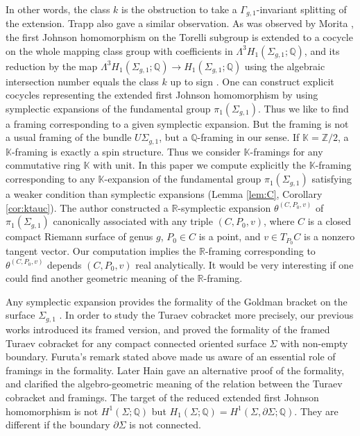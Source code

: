 \documentclass[a4paper,12pt, twoside]{amsart}
\theoremstyle{definition}
\theoremstyle{remark}
\numberwithin{equation}{section}
\newcommand\bK{{\mathbb{K}}}
\newcommand\bQ{{\mathbb{Q}}}
\newcommand\bR{{\mathbb{R}}}
\newcommand\bZ{{\mathbb{Z}}}
\newcommand\La{\Lambda}
\newcommand\pa{\partial}
\newcommand\Sgone{\Sigma_{g,1}}
\begin{document}
In other words, the class $k$ is the obstruction to take a $\Gamma_{g,1}$-invariant splitting of the extension. Trapp \cite{Trapp} also gave a similar observation. %
As was observed by Morita \cite{Mo93}, 
the first Johnson homomorphism \cite{J80b} on the Torelli subgroup is extended to a cocycle on the whole mapping class group with coefficients in $\La^3H_1(\Sigma_{g,1}; \bQ)$, and its reduction by the map $\La^3H_1(\Sigma_{g,1}; \bQ) \to H_1(\Sigma_{g,1}; \bQ)$ using the algebraic intersection number equals the class $k$ up to sign \cite[Remark 4.9]{Mo93}. 
One can construct explicit cocycles representing the extended first Johnson homomorphism by using symplectic expansions \cite{Mas12}
of the fundamental group $\pi_1(\Sigma_{g,1})$. 
Thus we like to find a framing corresponding to a given symplectic expansion. 
But the framing is not a usual framing of the  bundle $U\Sigma_{g,1}$, but a $\bQ$-framing in our sense. If $\bK= \bZ/2$, a $\bK$-framing is exactly a spin structure. Thus we consider $\bK$-framings for any commutative ring $\bK$ with unit. 
In this paper we compute explicitly the $\bK$-framing corresponding to any $\bK$-expansion of the fundamental group $\pi_1(\Sgone)$ satisfying a weaker condition than symplectic expansions (Lemma \ref{lem:C}, Corollary \ref{cor:ktauc}). 
The author \cite{Kaw06} constructed a $\bR$-symplectic expansion $\theta^{(C, P_0, v)}$ of $\pi_1(\Sgone)$ canonically associated with any triple $(C, P_0, v)$, where $C$ is a closed compact Riemann surface of genus $g$, $P_0 \in C$ is a point, and $v \in T_{P_0}C$ is a nonzero tangent vector. 
Our computation implies the $\bR$-framing corresponding to $\theta^{(C, P_0, v)}$ depends $(C, P_0, v)$ real analytically. 
It would be very interesting if one could find another geometric meaning of the $\bR$-framing. 
\par
\medskip
Any symplectic expansion provides the formality of the Goldman bracket \cite{G2} on the surface $\Sigma_{g,1}$ \cite{KK14}. 
In order to study the Turaev cobracket \cite{Tu1991} more precisely, 
our previous works \cite{AKKNa, AKKN18, %
AKKNb} introduced its framed version, and proved the formality of the framed Turaev cobracket for any compact connected oriented surface $\Sigma$ with non-empty boundary. 
Furuta's remark stated above made us aware of an essential role of framings in the formality. 
Later Hain \cite{Ha21} gave an alternative proof of the formality, and clarified the algebro-geometric meaning of the relation between the Turaev cobracket and framings. The target of the reduced extended first Johnson homomorphism is not $H^1(\Sigma; \bQ)$ but $H_1(\Sigma; \bQ) = H^1(\Sigma, \pa\Sigma; \bQ)$. They are different if the boundary $\pa\Sigma$ is not connected. 
\end{document}
